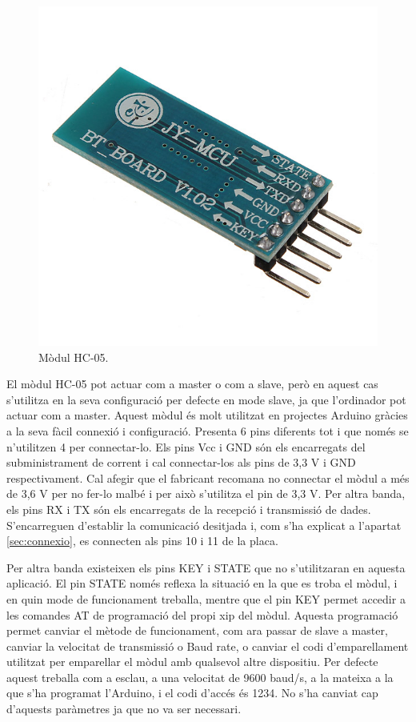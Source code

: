 \begin{figure}[H]
	\centering
	\includegraphics[scale=0.3]{HC05}
	\caption{Mòdul HC-05.}
	\label{fig:HC05}
\end{figure}

El mòdul HC-05 pot actuar com a master o com a slave, però en aquest cas s’utilitza en la seva configuració per defecte en mode slave, ja que l’ordinador pot actuar com a master. Aquest mòdul és molt utilitzat en projectes Arduino gràcies a la seva fàcil connexió i configuració. Presenta 6 pins diferents tot i que només se n’utilitzen 4 per connectar-lo. Els pins Vcc i GND són els encarregats del subministrament de corrent i cal connectar-los als pins de 3,3 V i GND respectivament. Cal afegir que el fabricant recomana no connectar el mòdul a més de 3,6 V per no fer-lo malbé i per això s’utilitza el pin de 3,3 V. Per altra banda, els pins RX i TX són els encarregats de la recepció i transmissió de dades. S'encarreguen d'establir la comunicació desitjada i, com s’ha explicat a l’apartat \ref{sec:connexio}, es connecten als pins 10 i 11 de la placa. 

Per altra banda existeixen els pins KEY i STATE que no s’utilitzaran en aquesta aplicació. El pin STATE només reflexa la situació en la que es troba el mòdul, i en quin mode de funcionament treballa, mentre que el pin KEY permet accedir a les comandes AT de programació del propi xip del mòdul. Aquesta programació permet canviar el mètode de funcionament, com ara passar de slave a master, canviar la velocitat de transmissió o Baud rate, o canviar el codi d’emparellament utilitzat per emparellar el mòdul amb qualsevol altre dispositiu. Per defecte aquest treballa com a esclau, a una velocitat de 9600 baud/s, a la mateixa a la que s’ha programat l’Arduino, i el codi d’accés és 1234. No s’ha canviat cap d’aquests paràmetres ja que no va ser necessari. 

